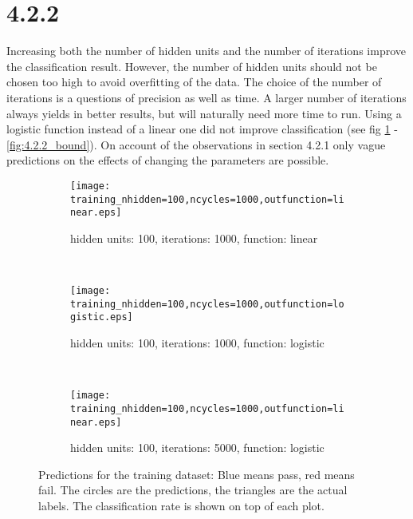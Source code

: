 \documentclass[a4paper,11pt]{article}
\theoremstyle{definition}
\theoremstyle{plain}
\theoremstyle{remark}
\begin{document}
\clearpage
\section*{4.2.2}

Increasing both the number of hidden units and the number of iterations improve the classification result. However, the number of hidden units should not be chosen too high to avoid overfitting of the data. The choice of the number of iterations is a questions of precision as well as time. A larger number of iterations always yields in better results, but will naturally need more time to run. Using a logistic function instead of a linear one did not improve classification (see fig \ref{fig:4.2.2_train} - \ref{fig:4.2.2_bound}).
On account of the observations in section 4.2.1 only vague predictions on the effects of changing the parameters are possible.


\begin{figure}
\centering
\begin{subfigure}[b]{0.31\textwidth}
\centering
\texttt{[image: training\_nhidden=100,ncycles=1000,outfunction=linear.eps]}
\caption{hidden units: 100, iterations: 1000, function: linear}
\end{subfigure}
~
\begin{subfigure}[b]{0.31\textwidth}
\centering
\texttt{[image: training\_nhidden=100,ncycles=1000,outfunction=logistic.eps]}
\caption{hidden units: 100, iterations: 1000, function: logistic}
\end{subfigure}
~
\begin{subfigure}[b]{0.31\textwidth}
\centering
\texttt{[image: training\_nhidden=100,ncycles=1000,outfunction=linear.eps]}
\caption{hidden units: 100, iterations: 5000, function: logistic}
\end{subfigure}

\caption{Predictions for the training dataset: Blue means pass, red means fail. The circles are the predictions, the triangles are the actual labels. The classification rate is shown on top of each plot.}
\label{fig:4.2.2_train}
\end{figure}
\end{document}
